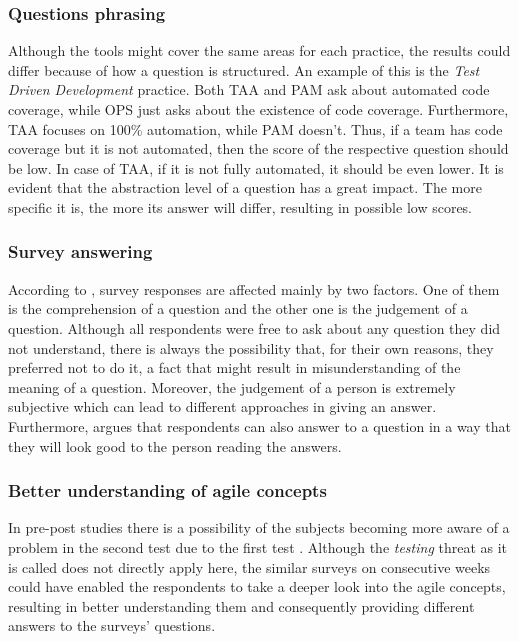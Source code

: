 \subsubsection{Questions phrasing}
Although the tools might cover the same areas for each practice, the results could differ because of how a question is structured. An example of this is the \textit{Test Driven Development} practice. Both \ac{TAA} and \ac{PAM} ask about automated code coverage, while \ac{OPS} just asks about the existence of code coverage. Furthermore, \ac{TAA} focuses on 100\% automation, while \ac{PAM} doesn’t. Thus, if a team has code coverage but it is not automated, then the score of the respective question should be low. In case of \ac{TAA}, if it is not fully automated, it should be even lower. It is evident that the abstraction level of a question has a great impact. The more specific it is, the more its answer will differ, resulting in possible low scores.

\subsubsection{Survey answering}
According to \citet{Wagner_Zeglovits}, survey responses are affected mainly by two factors. One of them is the comprehension of a question and the other one is the judgement of a question. Although all respondents were free to ask about any question they did not understand, there is always the possibility that, for their own reasons, they preferred not to do it, a fact that might result in misunderstanding of the meaning of a question. Moreover, the judgement of a person is extremely subjective which can lead to different approaches in giving an answer. Furthermore, \citet{Floyd_Fowler} argues that respondents can also answer to a question in a way that they will look good to the person reading the answers. 

\subsubsection{Better understanding of agile concepts}
In pre-post studies there is a possibility of the subjects becoming more aware of a problem in the second test due to the first test \cite{Campbell_Stanley}. Although the \textit{testing} threat as it is called does not directly apply here, the similar surveys on consecutive weeks could have enabled the respondents to take a deeper look into the agile concepts, resulting in better understanding them and consequently providing different answers to the surveys' questions. 

